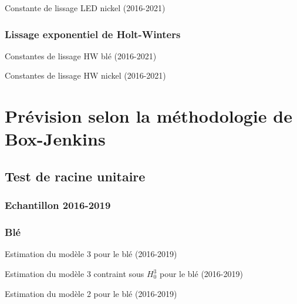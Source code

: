 \documentclass[12pt,a4paper]{article}
\begin{document}
\begin{table}[H]
    \centering
    \caption{Constante de lissage LED nickel (2016-2021)}
    \label{tab:led_nickel21}
    \sffamily
    
\end{table}

\subsubsection{Lissage exponentiel de Holt-Winters}\label{appendix:hw_21}
\begin{table}[H]
    \centering
    \caption{Constantes de lissage HW blé (2016-2021)}
    \label{tab:hw_ble}
    \sffamily
    
\end{table}
\begin{table}[H]
    \centering
    \caption{Constantes de lissage HW nickel (2016-2021)}
    \label{tab:hw_nickel}
    \sffamily
    
\end{table}

\section{Prévision selon la méthodologie de Box-Jenkins}
\setcounter{table}{0}
\setcounter{figure}{0}
\subsection{Test de racine unitaire}
\subsubsection{Echantillon 2016-2019}
\subsubsection*{Blé}
\begin{table}[H]
    \centering
    \caption{Estimation du modèle 3 pour le blé (2016-2019)}
    \label{tab:mod3_ble19}
    \sffamily
    
\end{table}

\begin{table}[H]
    \centering
    \caption{Estimation du modèle 3 contraint sous $H_{0}^{3}$ pour le blé (2016-2019)}
    \label{tab:mod3cont_ble19}
    \sffamily
    
\end{table}

\begin{table}[H]
    \centering
    \caption{Estimation du modèle 2 pour le blé (2016-2019)}
    \label{tab:mod2_ble19}
    \sffamily
    
\end{table}
\end{document}

